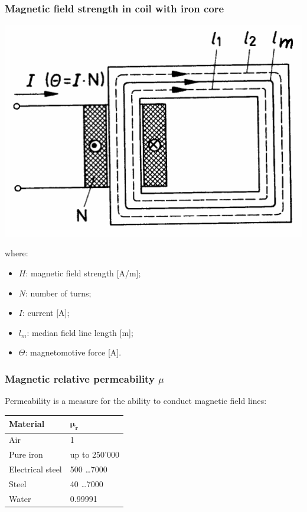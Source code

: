 \documentclass{article}
\begin{document}

\subsubsection{Magnetic field strength in coil with iron core}

\begin{center}
    \includegraphics[width=.4\textwidth]{media/strength_iron_core.png}
\end{center}


where:
\begin{itemize}
    \item $H$: magnetic field strength [A/m];
    \item $N$: number of turns;
    \item $I$: current [A];
    \item $l_{m}$: median field line length [m];
    \item $\Theta$: magnetomotive force [A].
\end{itemize}

\subsubsection{Magnetic relative permeability $\mu$}
Permeability is a measure for the ability to conduct magnetic field lines:

\begin{center}
    \begin{tabular}{|l|l|}
        \hline
        \textbf{Material} & $\mathbf{\mu_r}$ \\
        \hline
        Air & 1 \\
        Pure iron & up to 250'000 \\
        Electrical steel & 500 \ldots 7000 \\
        Steel & 40 \ldots 7000 \\
        Water & 0.99991 \\
        \hline
    \end{tabular}
\end{center}
\end{document}

